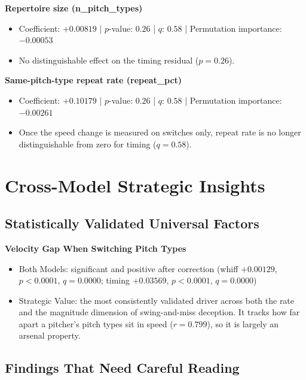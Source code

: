\documentclass[11pt]{article}
\newcommand{\feat}[1]{\textbf{#1}}
\begin{document}
\feat{Repertoire size (n\_pitch\_types)}
\begin{itemize}
\item Coefficient: $+0.00819$ \;|\; $p$-value: $0.26$ \;|\; $q$: $0.58$ \;|\; Permutation importance: $-0.00053$
\item No distinguishable effect on the timing residual ($p=0.26$).
\end{itemize}

\feat{Same-pitch-type repeat rate (repeat\_pct)}
\begin{itemize}
\item Coefficient: $+0.10179$ \;|\; $p$-value: $0.26$ \;|\; $q$: $0.58$ \;|\; Permutation importance: $-0.00261$
\item Once the speed change is measured on switches only, repeat rate is no longer distinguishable from zero for timing ($q=0.58$).
\end{itemize}

\section*{Cross-Model Strategic Insights}

\subsection*{Statistically Validated Universal Factors}

\feat{Velocity Gap When Switching Pitch Types}
\begin{itemize}
\item Both Models: significant and positive after correction (whiff $+0.00129$, $p<0.0001$, $q=0.0000$; timing $+0.03569$, $p<0.0001$, $q=0.0000$)
\item Strategic Value: the most consistently validated driver across both the rate and the magnitude dimension of swing-and-miss deception. It tracks how far apart a pitcher's pitch types sit in speed ($r=0.799$), so it is largely an arsenal property.
\end{itemize}

\subsection*{Findings That Need Careful Reading}
\end{document}
